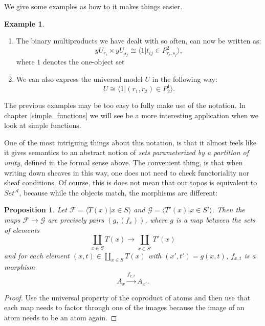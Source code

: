 \documentclass[a4paper]{amsproc}
\theoremstyle{plain}
\newtheorem{proposition}[theorem]{Proposition}
\theoremstyle{definition}
\newtheorem{example}[theorem]{Example}
\theoremstyle{remark}
\numberwithin{equation}{section}
\begin{document}
We give some examples as how to it makes things easier. 

\begin{example}
    \begin{enumerate}
        \item The binary multiproducts we have dealt with so often, can now be written as:
        \[ y U_{r_i} \times y U_{s_j} \cong \langle 1 | t_{ij} \in P^2_{r_i,s_j} \rangle, \] %
        where $1$ denotes the one-object set
        \item We can also express the universal model $U$ in the following way:
        \[ U \cong \langle 1 | (r_1,r_2) \in P^1_2 \rangle. \]

    \end{enumerate}
\end{example}

The previous examples may be too easy to fully make use of the notation. In chapter \ref{simple_functions} we will see be a more interesting application when we look at simple functions.

One of the most intriguing things about this notation, is that it almost feels like it gives semantics to an abstract notion of \emph{sets parameterized by a partition of unity}, defined in the formal sense above. The convenient thing, is that when writing down sheaves in this way, one does not need to check functoriality nor sheaf conditions. Of course, this is does not mean that our topos is equivalent to $Set^{\mathcal{A}}$, because while the objects match, the morphisms are different:

\begin{proposition}\label{atom_coprod_maps}
    Let $\mathcal{F} = \langle T(x) | x \in S \rangle$ and $\mathcal{G} = \langle T'(x) | x \in S' \rangle $. Then the maps $\mathcal{F} \to \mathcal{G}$ are precisely pairs $(g, (f_x))$, where $g$ is a map between the sets of elements
    \[
        \coprod_{x \in S} T(x) \to \coprod_{x \in S'} T'(x)
    \]
    and for each element $(x,t) \in \coprod_{x \in S} T(x)$ with $(x',t') = g(x,t)$, $f_{x,t}$ is a morphism
    \[
        A_x \xrightarrow{f_{x,t}} A_{x'} .
    \]
\end{proposition}
\begin{proof}
    Use the universal property of the coproduct of atoms and then use that each map needs to factor through one of the images because the image of an atom needs to be an atom again.
\end{proof}
\end{document}

